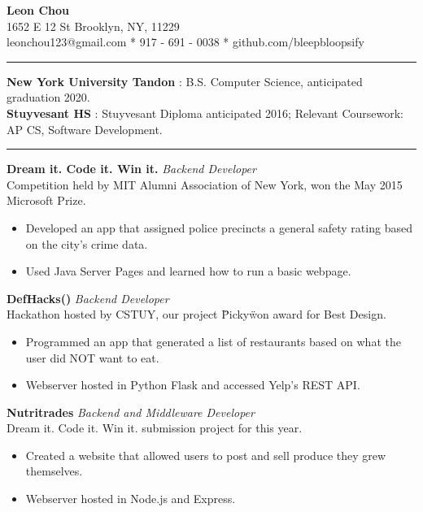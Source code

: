 \documentclass[14]{article}
\begin{document}
  \begin{center}
    \textbf{{\LARGE Leon Chou}}\\
    1652 E 12 St Brooklyn, NY, 11229\\
    \hspace{4px} %
    leonchou123@gmail.com
    \hspace{3px} * \hspace{3px}
    917 - 691 - 0038
    \hspace{3px} * \hspace{3px} github.com/bleepbloopsify\\
  \end{center}
  \vspace{0.1cm} \hrule \vspace{0.3cm}
  \noindent\textbf{New York University Tandon} : B.S. Computer Science, anticipated graduation 2020.\\
  \textbf{Stuyvesant HS} : Stuyvesant Diploma anticipated 2016;
  Relevant Coursework: AP CS, Software Development.

  \vspace{0.1cm} \hrule \vspace{0.3cm}
  \noindent\textbf{Dream it. Code it. Win it.}\textit{ Backend Developer}\\
  Competition held by MIT Alumni Association of New York, won the May 2015 Microsoft Prize.
  \begin{itemize}[label={--},noitemsep, topsep=0pt]
    \item Developed an app that assigned police precincts a general safety rating based on the city's crime data.
    \item Used Java Server Pages and learned how to run a basic webpage.
  \end{itemize}
  \textbf{DefHacks()}\textit{ Backend Developer}\\ Hackathon hosted by CSTUY, our project \"Picky\" won award for Best Design.
  \begin{itemize}[label={--},noitemsep, topsep=0pt]
    \item Programmed an app that generated a list of restaurants based on what the user did NOT want to eat.
    \item Webserver hosted in Python Flask and accessed Yelp's REST API.
  \end{itemize}
  \textbf{Nutritrades}\textit{ Backend and Middleware Developer}\\
  Dream it. Code it. Win it. submission project for this year.
  \begin{itemize}[label={--},noitemsep, topsep=0pt]
    \item Created a website that allowed users to post and sell produce they grew themselves.
    \item Webserver hosted in Node.js and Express.
  \end{itemize}
\end{document}
